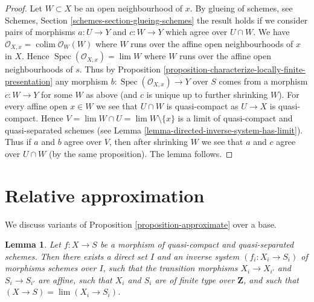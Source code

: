 \documentclass{stacks-project}
\theoremstyle{plain}
\newtheorem{lemma}[subsection]{Lemma}
\theoremstyle{definition}
\theoremstyle{remark}
\numberwithin{equation}{subsection}
\def\lim{\mathop{\mathrm{lim}}\nolimits}
\def\colim{\mathop{\mathrm{colim}}\nolimits}
\def\Spec{\mathop{\mathrm{Spec}}}
\begin{document}
\begin{proof}
Let $W \subset X$ be an open neighbourhood of $x$. By
glueing of schemes, see
Schemes, Section \ref{schemes-section-glueing-schemes}
the result holds if we consider pairs of morphisms
$a : U \to Y$ and $c : W \to Y$ which agree over $U \cap W$.
We have $\mathcal{O}_{X, x} = \colim \mathcal{O}_W(W)$ where
$W$ runs over the affine open neighbourhoods of $x$ in $X$.
Hence $\Spec(\mathcal{O}_{X, x}) = \lim W$ where $W$
runs over the affine open neighbourhoods of $s$.
Thus by
Proposition \ref{proposition-characterize-locally-finite-presentation}
any morphism $b : \Spec(\mathcal{O}_{X, x}) \to Y$
over $S$ comes from a morphism $c : W \to Y$ for some $W$ as above
(and $c$ is unique up to further shrinking $W$).
For every affine open $x \in W$ we see that $U \cap W$
is quasi-compact as $U \to X$ is quasi-compact.
Hence $V = \lim W \cap U = \lim W \setminus \{x\}$ is a limit of
quasi-compact and quasi-separated schemes (see
Lemma \ref{lemma-directed-inverse-system-has-limit}).
Thus if $a$ and $b$ agree over $V$, then after shrinking $W$
we see that $a$ and $c$ agree over $U \cap W$ (by the same
proposition). The lemma follows.
\end{proof}







\section{Relative approximation}
\label{section-relative-approximation}

\noindent
We discuss variants of Proposition \ref{proposition-approximate}
over a base.

\begin{lemma}
\label{lemma-approximate-morphism}
Let $f : X \to S$ be a morphism of quasi-compact and quasi-separated schemes.
Then there exists a direct set $I$ and an inverse system $(f_i : X_i \to S_i)$
of morphisms schemes over $I$, such that the transition morphisms
$X_i \to X_{i'}$ and $S_i \to S_{i'}$ are affine, such that $X_i$
and $S_i$ are of finite type over $\mathbf{Z}$, and such that
$(X \to S) = \lim (X_i \to S_i)$.
\end{lemma}
\end{document}
